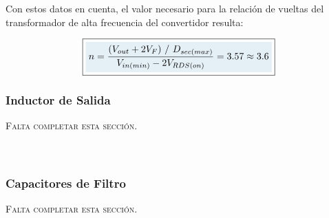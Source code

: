 Con estos datos en cuenta, el valor necesario para la relación de vueltas del transformador de alta frecuencia del convertidor resulta:

\begin{equation}\label{relacion_vueltas_valor}
    \boxed{
    \highlight{n = \frac{(V_{out}+2V_F)\ /\ D_{sec(max)}}{V_{in(min)}-2V_{RDS(on)}} = \num{3.57} \approx \num{3.6}}
    }
\end{equation}

\subsubsection{Inductor de Salida}

{\Bold\scshape\Large Falta completar esta sección.}\\

\lipsum[5]\\

\lipsum[6]\\

\subsubsection{Capacitores de Filtro}

{\Bold\scshape\Large Falta completar esta sección.}\\

\lipsum[7]\\

\lipsum[8]\\